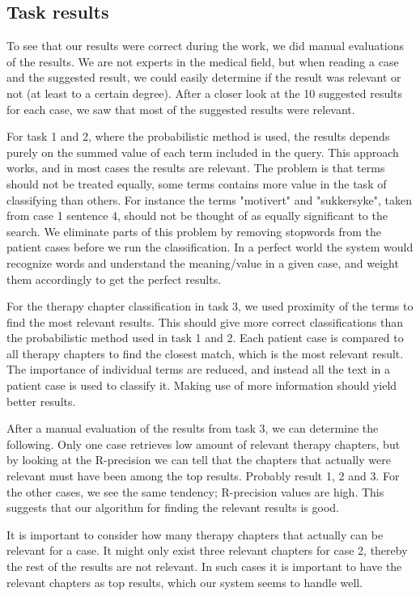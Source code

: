 \subsection{Task results}
To see that our results were correct during the work, we did manual evaluations of the results. We are not experts in the medical field, but when reading a case and the suggested result, we could easily determine if the result was relevant or not (at least to a certain degree). After a closer look at the 10 suggested results for each case, we saw that most of the suggested results were relevant.

For task 1 and 2, where the probabilistic method is used, the results depends purely on the summed value of each term included in the query. This approach works, and in most cases the results are relevant. The problem is that terms should not be treated equally, some terms contains more value in the task of classifying than others. For instance the terms "motivert" and "sukkersyke", taken from case 1 sentence 4, should not be thought of as equally significant to the search. We eliminate parts of this problem by removing stopwords from the patient cases before we run the classification. In a perfect world the system would recognize words and understand the meaning/value in a given case, and weight them accordingly to get the perfect results. 

For the therapy chapter classification in task 3, we used proximity of the terms to find the most relevant results. This should give more correct classifications than the probabilistic method used in task 1 and 2. Each patient case is compared to all therapy chapters to find the closest match, which is the most relevant result. The importance of individual terms are reduced, and instead all the text in a patient case is used to classify it. Making use of more information should yield better results.

After a manual evaluation of the results from task 3, we can determine the following. Only one case retrieves low amount of relevant therapy chapters, but by looking at the R-precision we can tell that the chapters that actually were relevant must have been among the top results. Probably result 1, 2 and 3. For the other cases, we see the same tendency; R-precision values are high. This suggests that our algorithm for finding the relevant results is good. 

It is important to consider how many therapy chapters that actually can be relevant for a case. It might only exist three relevant chapters for case 2, thereby the rest of the results are not relevant. In such cases it is important to have the relevant chapters as top results, which our system seems to handle well.

